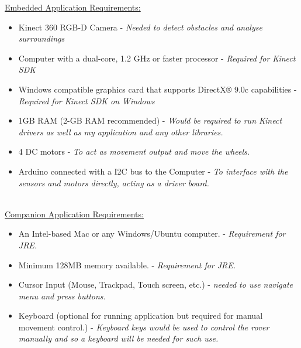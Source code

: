 \documentclass[11pt]{report}
\begin{document}
		\underline{Embedded Application Requirements:}

		\begin{itemize}
			\item{Kinect 360 RGB-D Camera} - \emph{Needed to detect obstacles and analyse surroundings}
			\item{Computer with a dual-core, 1.2 GHz or faster processor} - \emph{Required for Kinect SDK}
			\item{Windows compatible graphics card that supports DirectX® 9.0c capabilities} - \emph{Required for Kinect SDK on Windows}
			\item{1GB RAM (2-GB RAM recommended)} - \emph{Would be required to run Kinect drivers as well as my application and any other libraries.}
			\item{4 DC motors} - \emph{To act as movement output and move the wheels.}
			\item{Arduino connected with a I2C bus to the Computer} - \emph{To interface with the sensors and motors directly, acting as a driver board.}
		\end{itemize}

		~\\
		\underline{Companion Application Requirements:}
		
		\begin{itemize}
			\item{An Intel-based Mac or any Windows/Ubuntu computer.} - \emph{Requirement for JRE.}
			\item{Minimum 128MB memory available.} - \emph{Requirement for JRE.}
			\item{Cursor Input (Mouse, Trackpad, Touch screen, etc.)} - \emph{needed to use navigate menu and press buttons.}
			\item{Keyboard (optional for running application but required for manual movement control.)} - \emph{Keyboard keys would be used to control the rover manually and so a keyboard will be needed for such use.}
		\end{itemize}

\newpage
\end{document}
